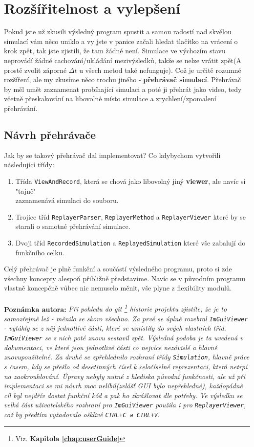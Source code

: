 \chapter{Rozšířitelnost a vylepšení}

Pokud jste už zkusili výsledný program spustit a samou radostí nad skvělou simulací vám něco uniklo a vy jste v panice začali hledat tlačítko na vrácení o krok zpět, tak jste zjistili, že tam žádné není. Simulace ve výchozím stavu neprovádí žádné cachování/ukládání mezivýsledků, takže se nelze vrátit zpět(A prostě zvolit záporné $ \Delta t $ u všech metod také nefunguje). Což je určitě rozumné rozšíření, ale my zkusíme něco trochu jiného - \textbf{přehrávač simulací}.
Přehrávač by měl umět zaznamenat probíhající simulaci a poté ji přehrát jako video, tedy včetně přeskakování na libovolné místo simulace a zrychlení/zpomalení přehrávání.

\section{Návrh přehrávače}
Jak by se takový přehrávač dal implementovat?
Co kdybychom vytvořili následující třídy:
\begin{enumerate}
	\item Třída \texttt{ViewAndRecord}, která se chová jako libovolný jiný \textbf{viewer}, ale navíc si "tajně" \\zaznamenává simulaci do souboru. 
	\item Trojice tříd \texttt{ReplayerParser}, \texttt{ReplayerMethod} a \texttt{ReplayerViewer} které by se starali o samotné přehrávání simulace.
	\item Dvoji tříd \texttt{RecordedSimulation} a \texttt{ReplayedSimulation} které vše zabalují do funkčního celku.
\end{enumerate}
Celý přehrávač je plně funkční a součástí výsledného programu, proto si zde všechny koncepty alespoň přibližně představíme.
Navíc se v původním programu vlastně koncepčně vůbec nic nemuselo měnit, vše plyne z flexibility modulů.
\\
\\
\textbf{Poznámka autora:}  \textit{Při pohledu do git
	\footnote{Viz. \textbf{Kapitola \ref{chap:userGuide} }}
historie projektu zjistíte, že je to samozřejmě lež - měnilo se skoro všechno. Za prvé se úplně rozebral \texttt{ImGuiViewer} - vytáhly se z něj jednotlivé části, které se umístily do svých vlastních tříd. \texttt{ImGuiViewer} se z nich poté znovu sestavil zpět. Výsledná podoba je ta uvedená v dokumentaci, ve které jsou jednotlivé části co nejvíce nezávislé a hlavně znovupoužitelné.
Za druhé se zpřehlednilo rozhraní třídy \texttt{Simulation}, hlavně práce s časem, kdy se přešlo od desetinných čísel k celočíselné reprezentaci, která netrpí na zaokrouhlování.
Úpravy nebyly nutné z hlediska původní funkčnosti, ale už při implementaci se mi návrh moc nelíbil(zvlášť GUI bylo nepřehledné), každopádně cíl byl nejdřív dostat funkční kód a pak ho zkrášlovat dle potřeby.
Ve výsledku se velká část uživatelského rozhraní pro \texttt{ImGuiViewer} použila i pro \texttt{ReplayerViewer}, což by předtím vyžadovalo ošklivé \texttt{\small CTRL+C a  CTRL+V}}.

